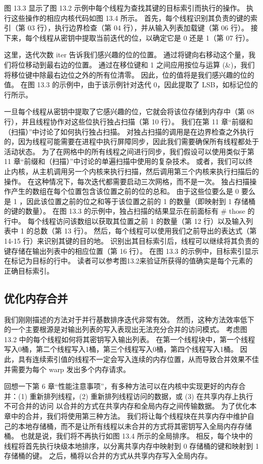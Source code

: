 图 13.3 显示了图 13.2 示例中每个线程为查找其键的目标索引而执行的操作。 执行这些操作的相应内核代码如图 13.4 所示。 首先，每个线程识别其负责的键的索引（第 03 行），执行边界检查（第 04 行），并从输入列表加载键（第 06 行）。 接下来，每个线程从密钥中提取当前迭代的位，以确定它是 0 还是 1（第 07 行）。

这里，迭代次数 iter 告诉我们感兴趣的位的位置。 通过将键向右移动这个量，我们将位移动到最右边的位置。 通过在移位键和 1 之间应用按位与运算 (\&)，我们将移位键中除最右边位之外的所有位清零。 因此，位的值将是我们感兴趣的位的值。 在图 13.3 的示例中，由于该示例针对迭代 0，因此提取了 LSB，如标记位的行所示。

一旦每个线程从密钥中提取了它感兴趣的位，它就会将该位存储到内存中（第 08 行），并且线程协作对这些位执行独占扫描（第 10 行）。 我们在第 11 章“前缀和（扫描）”中讨论了如何执行独占扫描。 对独占扫描的调用是在边界检查之外执行的，因为线程可能需要在进程中执行屏障同步，因此我们需要确保所有线程都处于活动状态。 为了在网格中的所有线程之间进行同步，我们假设可以使用类似于第 11 章“前缀和（扫描）”中讨论的单遍扫描中使用的复杂技术。 或者，我们可以终止内核，从主机调用另一个内核来执行扫描，然后调用第三个内核来执行扫描后的操作。 在这种情况下，每次迭代都需要启动三次网格，而不是一次。 独占扫描操作产生的数组在每个位置包含该位置之前的位的总和。 由于这些位要么是 0 要么是 1 ，因此该位置之前的位之和等于该位置之前的 1 的数量（即映射到 1 存储桶的键的数量）。 在图 13.3 的示例中，独占扫描的结果显示在前面标有 \# those 的行中。 每个线程访问该数组以获取其位置之前 1 的数量（第 12 行）以及输入列表中 1 的总数（第 13 行）。 然后，每个线程可以使用我们之前导出的表达式（第 14-15 行）来识别其键的目的地。 识别出其目标索引后，线程可以继续将其负责的键存储在输出列表中的相应位置（第 16 行）。 在图 13.3 的示例中，目标索引显示在标记为目标的行中。 读者可以参考图13.2来验证所获得的值确实是每个元素的正确目标索引。

\subsection{优化内存合并}
我们刚刚描述的方法对于并行基数排序迭代非常有效。 然而，这种方法效率低下的一个主要根源是对输出列表的写入表现出无法充分合并的访问模式。 考虑图 13.2 中的每个线程如何将其密钥写入输出列表。 在第一个线程块中，第一个线程写入0桶，第二个线程写入1桶，第三个线程写入0桶，第四个线程写入1桶。 因此，具有连续索引值的线程不一定会写入连续的内存位置，从而导致合并效果不佳并需要为每个 warp 发出多个内存请求。

回想一下第 6 章“性能注意事项”，有多种方法可以在内核中实现更好的内存合并：(1) 重新排列线程，(2) 重新排列线程访问的数据，或 (3) 在共享内存上执行不可合并的访问 以合并的方式在共享内存和全局内存之间传输数据。 为了优化本章中的合并，我们将使用第三种方法。 我们将让每个线程块在共享内存中维护自己的本地存储桶，而不是让所有线程以未合并的方式将其密钥写入全局内存存储桶。 也就是说，我们将不再执行如图 13.4 所示的全局排序。 相反，每个块中的线程将首先执行块级本地排序，以分离共享内存中映射到 0 存储桶的键和映射到 1 存储桶的键。 之后，桶将以合并的方式从共享内存写入全局内存。

